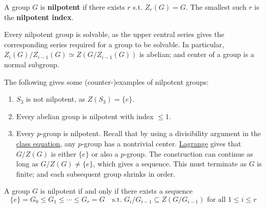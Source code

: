 \begin{definition}[Nilpotent]
    A group $G$ is \textbf{nilpotent} if there exists $r$ s.t. $Z_r(G) = G$. The smallest such $r$ is the \textbf{nilpotent index}.
\end{definition}

\begin{remark}
    Every nilpotent group is solvable, as the upper central series gives the corresponding series required for a group to be solvable. In particular, $Z_i(G)/Z_{i-1}(G) \simeq Z(G/Z_{i-1}(G))$ is abelian; and center of a group is a normal subgroup.
\end{remark}

\begin{example}\label{ex: nilpotent groups}
    The following gives some (counter-)examples of nilpotent groups:
    \begin{enumerate}
        \item $S_3$ is not nilpotent, as $Z(S_3) = \{e\}$.
        \item Every abelian group is nilpotent with index $\leq 1$.
        \item Every $p$-group is nilpotent. Recall that by using a divisibility argument in the \hyperref[eq: class equation]{class equation}, any $p$-group has a nontrivial center. \hyperref[thm: Lagrange]{Lagrange} gives that $G/Z(G)$ is either $\{e\}$ or also a $p$-group. The construction can continue as long as $G/Z(G) \neq \{e\}$, which gives a sequence. This must terminate as $G$ is finite; and each subsequent group shrinks in order.
    \end{enumerate}
\end{example}

\begin{proposition}
    A group $G$ is nilpotent if and only if there exists a sequence
    \[
        \{e\} = G_0 \leq G_1 \leq \cdots \leq G_r = G \quad \text{s.t. $G_i/G_{i-1} \subseteq Z(G/G_{i-1})$ for all $1 \leq i \leq r$}
    \]
\end{proposition}

